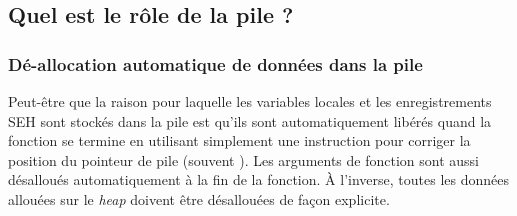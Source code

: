 
\subsection{Quel est le rôle de la pile ?}








\subsubsection{Dé-allocation automatique de données dans la pile}

Peut-être que la raison pour laquelle les variables locales et les enregistrements SEH sont stockés dans la
pile est qu'ils sont automatiquement libérés quand la fonction se termine en utilisant simplement une
instruction pour corriger la position du pointeur de pile (souvent \ADD).
Les arguments de fonction sont aussi désalloués automatiquement à la fin de la fonction.
À l'inverse, toutes les données allouées sur le \emph{heap} doivent être désallouées de façon explicite.





